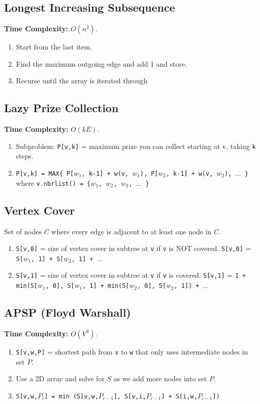 \documentclass[10pt,landscape,a4paper]{article}
\begin{document}
\begin{multicols*}{4}
\subsection{Longest Increasing Subsequence}
\textbf{Time Complexity:} $O(n^2)$.
\begin{enumerate}
    \item Start from the last item.
    \item Find the maximum outgoing edge and add 1 and store.
    \item Recurse until the array is iterated through
\end{enumerate}

\subsection{Lazy Prize Collection}
\textbf{Time Complexity:} $O(kE)$.
\begin{enumerate}
    \item Subproblem: \texttt{P[v,k]} = maximum prize you can collect starting at v, taking \texttt{k} steps. 
    \item \texttt{P[v,k] = MAX\{ P[$w_1$, k-1] + w(v, $w_1$), P[$w_2$, k-1] + w(v, $w_2$), $\dots$ \}} where \texttt{v.nbrlist() = \{$w_1$, $w_2$, $w_3$, $\dots$ \}}
\end{enumerate}

\subsection{Vertex Cover}
Set of nodes $C$ where every edge is adjacent to at least one node in $C$.
\begin{enumerate}
    \item \texttt{S[v,0]} = size of vertex cover in subtree at \texttt{v} if \texttt{v} is NOT covered.
    \subitem \texttt{S[v,0]} = \texttt{S[$w_1$, 1] + S[$w_2$, 1] + $\dots$}
    \item \texttt{S[v,1]} = size of vertex cover in subtree at \texttt{v} if \texttt{v} is covered.
    \subitem \texttt{S[v,1]} = \texttt{1 + min(S[$w_1$, 0], S[$w_1$, 1] + min(S[$w_2$, 0], S[$w_2$, 1]) + $\dots$}
\end{enumerate}

\subsection{APSP (Floyd Warshall)}
\textbf{Time Complexity:} $O(V^3)$.
\begin{enumerate}
    \item \texttt{S[v,w,P]} = shortest path from \texttt{v} to \texttt{w} that only uses intermediate nodes in set $P$.
    \item Use a 2D array and solve for $S$ as we add more nodes into set $P$.
    \item \texttt{S[v,w,$P_i$] = min (S[v,w,$P_{i-1}$], S[v,i,$P_{i-1}$] + S[i,w,$P_{i-1}$])}
\end{enumerate}


\end{multicols*}
\end{document}
